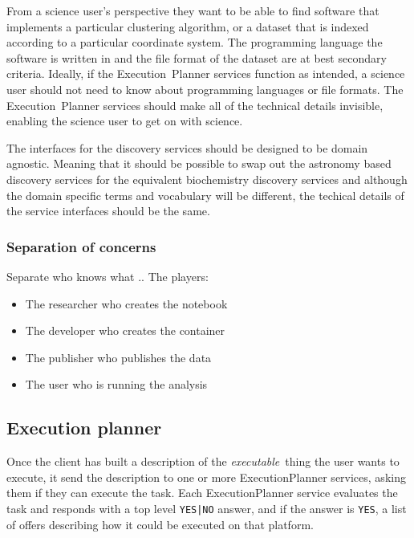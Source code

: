 \documentclass[11pt,a4paper]{ivoa}
\newcommand{\execplanner} {ExecutionPlanner}
\newcommand{\executionplanner} {Execution~Planner}
\newcommand{\codeword}[1] {\texttt{#1}}
\newcommand{\dataset} {dataset}
\newcommand{\executablething} {\textit{executable}~thing}
\begin{document}
From a science user's perspective they want to be able to find software that implements
a particular clustering algorithm, or a \dataset{} that is indexed according to a particular
coordinate system.
The programming language the software is written in and the file format of the \dataset{}
are at best secondary criteria.
Ideally, if the \executionplanner{} services function as intended, a science user should not
need to know about programming languages or file formats.
The \executionplanner{} services should make all of the technical details invisible,
enabling the science user to get on with science.

The interfaces for the discovery services should be designed to be domain agnostic.
Meaning that it should be possible to swap out the astronomy based discovery services
for the equivalent biochemistry discovery services and although the domain specific
terms and vocabulary will be different, the techical details of the service interfaces
should be the same.

\subsubsection{Separation of concerns}
\label{separate-concerns}

Separate who knows what ..
The players:
\begin{itemize}
    \item The researcher who creates the notebook
    \item The developer who creates the container
    \item The publisher who publishes the data
    \item The user who is running the analysis
\end{itemize}

\subsection{Execution planner}
\label{execution-planner-desc}

Once the client has built a description of the \executablething{} the user wants to
execute, it send the description to one or more
\execplanner{} services, asking them if they can execute the task.
Each \execplanner{} service evaluates the task and responds with a top level
\codeword{YES|NO} answer, and if
the answer is \codeword{YES}, a list of offers describing how it
could be executed on that platform.

\end{document}

